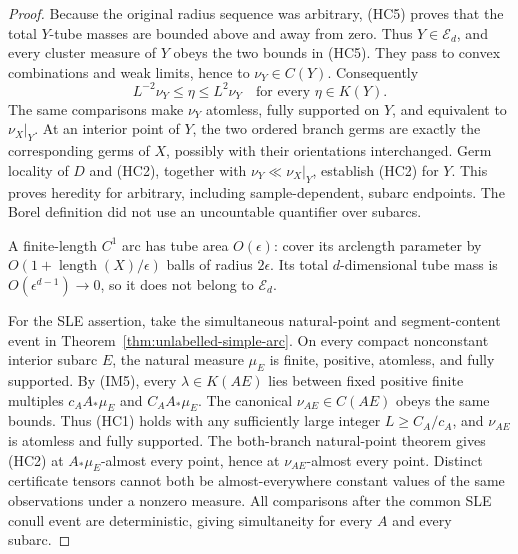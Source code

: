 \documentclass[11pt]{article}
\theoremstyle{definition}\newtheorem{definition}[theorem]{Definition}
\theoremstyle{remark}\newtheorem{remark}[theorem]{Remark}
\begin{document}
\begin{proof}
Because the original radius sequence was arbitrary, (HC5) proves
that the total $Y$-tube masses are bounded above and away from zero.
Thus $Y\in\mathcal E_d$, and every cluster measure of $Y$ obeys
the two bounds in (HC5). They pass to convex combinations and weak
limits, hence to $\nu_Y\in C(Y)$. Consequently
\[
    L^{-2}\nu_Y\le\eta\le L^2\nu_Y
            \quad\text{for every }\eta\in K(Y).
    \tag{HC6}
\]
The same comparisons make $\nu_Y$ atomless, fully supported on $Y$,
and equivalent to $\nu_X|_Y$. At an interior point of $Y$, the two
ordered branch germs are exactly the corresponding germs of $X$,
possibly with their orientations interchanged. Germ locality of $D$
and (HC2), together with $\nu_Y\ll\nu_X|_Y$, establish (HC2) for
$Y$. This proves heredity for arbitrary, including sample-dependent,
subarc endpoints. The Borel definition did not use an uncountable
quantifier over subarcs.

A finite-length $C^1$ arc has tube area $O(\epsilon)$: cover its
arclength parameter by $O(1+\operatorname{length}(X)/\epsilon)$
balls of radius $2\epsilon$. Its total $d$-dimensional tube mass
is $O(\epsilon^{d-1})\to0$, so it does not belong to
$\mathcal E_d$.

For the SLE assertion, take the simultaneous natural-point and
segment-content event in Theorem~\ref{thm:unlabelled-simple-arc}.
On every compact nonconstant interior subarc $E$, the natural measure
$\mu_E$ is finite, positive, atomless, and fully supported. By
(IM5), every $\lambda\in K(AE)$ lies between fixed positive
finite multiples $c_A A_*\mu_E$ and $C_A A_*\mu_E$.
The canonical $\nu_{AE}\in C(AE)$ obeys the same bounds.
Thus (HC1) holds with any sufficiently large integer
$L\ge C_A/c_A$, and $\nu_{AE}$ is atomless and fully supported.
The both-branch natural-point theorem gives (HC2) at
$A_*\mu_E$-almost every point, hence at $\nu_{AE}$-almost every
point. Distinct certificate tensors cannot both be almost-everywhere
constant values of the same observations under a nonzero measure.
All comparisons after the common SLE conull event are deterministic,
giving simultaneity for every $A$ and every subarc.
\end{proof}
\end{document}
